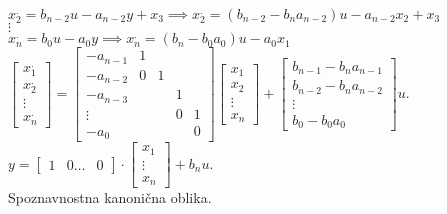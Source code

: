 \documentclass[a4paper, 12pt]{book}
\theoremstyle{definition}
\theoremstyle{remark}
\begin{document}
\begin{enumerate}[label=\arabic*)]
        $x^{.}_2 = b_{n-2} u - a_{n-2} y + x_3 \implies x^{.}_2 = (b_{n-2} - b_n a_{n-2}) u - a_{n-2} x_2 + x_3$ \\
        $\vdots$ \\
        $x^{.}_n = b_0 u - a_0 y \implies x^{.}_n = (b_n - b_0 a_0) u - a_0 x_1$ \\
        $\begin{bmatrix} x^{.}_1 \\ x^{.}_2 \\ \vdots \\ x^{.}_n \end{bmatrix} =
        \begin{bmatrix}
            -a_{n-1} & 1 & & & \\
            -a_{n-2} & 0 & 1 & & \\
            -a_{n-3} & & & 1 & \\
            \vdots & & & 0 & 1 \\
            -a_0 & & & & 0
        \end{bmatrix}
        \begin{bmatrix} x_1 \\ x_2 \\ \vdots \\ x_n \end{bmatrix} +
        \begin{bmatrix} b_{n-1} - b_n a_{n-1} \\  b_{n-2} - b_n a_{n-2} \\ \vdots \\ b_{0} - b_0 a_{0} \end{bmatrix} u$. \\
        $y = \begin{bmatrix} 1 & 0 \dots & 0 \end{bmatrix} \cdot \begin{bmatrix} x_1 \\ \vdots \\ x_n \end{bmatrix}
        + b_n u$. \\
        Spoznavnostna kanonična oblika.
\end{enumerate}



%
%



\end{document}
